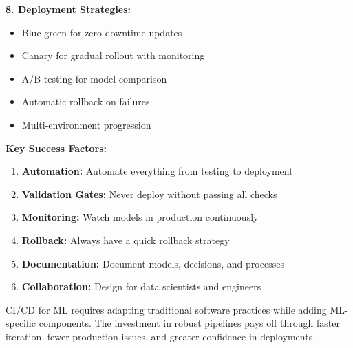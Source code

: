 \textbf{8. Deployment Strategies:}
\begin{itemize}
    \item Blue-green for zero-downtime updates
    \item Canary for gradual rollout with monitoring
    \item A/B testing for model comparison
    \item Automatic rollback on failures
    \item Multi-environment progression
\end{itemize}

\textbf{Key Success Factors:}
\begin{enumerate}
    \item \textbf{Automation:} Automate everything from testing to deployment
    \item \textbf{Validation Gates:} Never deploy without passing all checks
    \item \textbf{Monitoring:} Watch models in production continuously
    \item \textbf{Rollback:} Always have a quick rollback strategy
    \item \textbf{Documentation:} Document models, decisions, and processes
    \item \textbf{Collaboration:} Design for data scientists and engineers
\end{enumerate}

CI/CD for ML requires adapting traditional software practices while adding ML-specific components. The investment in robust pipelines pays off through faster iteration, fewer production issues, and greater confidence in deployments.

